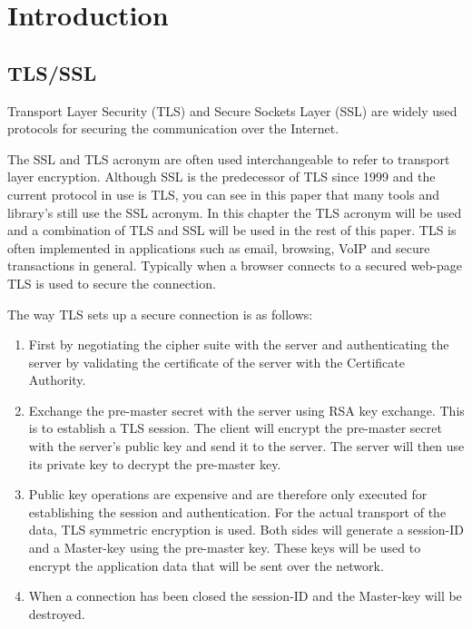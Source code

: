 \documentclass[12pt, a4paper]{report}
\begin{document}
\tableofcontents


\chapter{Introduction}

\section{TLS/SSL}

Transport Layer Security (TLS) and Secure Sockets Layer (SSL) are widely used protocols for securing the communication over the Internet. 

The SSL and TLS acronym are often used interchangeable to refer to transport layer encryption. Although SSL is the predecessor of TLS since 1999 and the current protocol in use is TLS, you can see in this paper that many tools and library's still use the SSL acronym. In this chapter the TLS acronym will be used and a combination of TLS and SSL will be used in the rest of this paper.
\newline
\newline
TLS is often implemented in applications such as email, browsing, VoIP and secure transactions in general. Typically when a browser connects to a secured web-page TLS is used to secure the connection. 

\noindent The way TLS sets up a secure connection is as follows: 

\begin{enumerate}
\item First by negotiating the cipher suite with the server and  authenticating the server by validating the certificate of the server with the Certificate Authority. 
\item Exchange the pre-master secret with the server using RSA key exchange. This is to establish a TLS session. 
The client will encrypt the pre-master secret with the server's public key and send it to the server. The server will then use its private key to decrypt the pre-master key.
\item Public key operations are expensive and are therefore only executed for establishing the session and authentication. For the actual transport of the data, TLS symmetric encryption is used. Both sides will generate a session-ID and a Master-key using the pre-master key. These keys will be used to encrypt the application data that will be sent over the network.
\item When a connection has been closed the session-ID and the Master-key will be destroyed.  
\end{enumerate}
\end{document}
